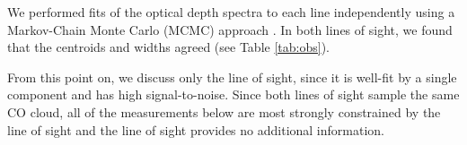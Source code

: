 
We performed fits of the optical depth spectra to each line independently using
a  Markov-Chain Monte Carlo (MCMC) approach \citep{Ginsburg2011c,Patil2010a}. In
both lines of sight, we found that the centroids and widths agreed (see Table
\ref{tab:obs}).  %

From this point on, we discuss only the \north line of sight, since it is
well-fit by a single component and has high signal-to-noise.  Since both lines
of sight sample the same CO cloud, all of the measurements below are most
strongly constrained by the \north line of sight and the \south line of sight
provides no additional information.

